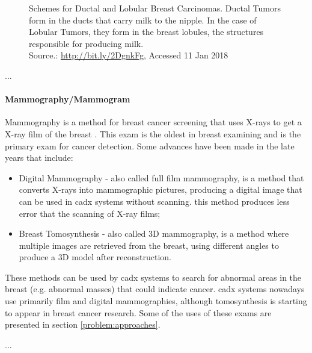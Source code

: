 \documentclass[
  twoside,
  11pt, a4paper,
  footinclude=true,
  headinclude=true,
  cleardoublepage=empty
]{scrbook}
\begin{document}
{\begin{figure}[t]
\begin{subfigure}[t]{0.5\textwidth}
                  \label{background:medical-image:breast-cancer-diagnosis:lobular}
                \end{subfigure}
                \caption[Schemes for Ductal and Lobular Breast Carcinomas]{Schemes for Ductal and Lobular Breast Carcinomas. Ductal Tumors form in the ducts that carry milk to the nipple. In the case of Lobular Tumors, they form in the breast lobules, the structures responsible for producing milk.\\Source.: \href{http://bit.ly/2DgnkFg}{http://bit.ly/2DgnkFg}, Accessed 11 Jan 2018}
                \label{background:medical-image:breast-cancer-diagnosis:types}
            \end{figure}
        }

        ...

        \paragraph{Mammography/Mammogram}
          Mammography is a method for breast cancer screening that uses X-rays to get a X-ray film of the breast \cite{starting2012mammography}. This exam is the oldest in breast examining and is the primary exam for cancer detection. Some advances have been made in the late years that include:

          \begin{itemize}
            \item Digital Mammography - also called full film mammography, is a method that converts X-rays into mammographic pictures, producing a digital image that can be used in \gls{cadx} systems without scanning. this method produces less error that the scanning of X-ray films;
            \item Breast Tomosynthesis - also called 3D mammography, is a method where multiple images are retrieved from the breast, using different angles to produce a 3D model after reconstruction.
          \end{itemize}

          These methods can be used by \gls{cadx} systems to search for abnormal areas in the breast (e.g. abnormal masses) that could indicate cancer. \gls{cadx} systems nowadays use primarily film and digital mammographies, although tomosynthesis is starting to appear in breast cancer research. Some of the uses of these exams are presented in section \ref{problem:approaches}.

        ...
\end{document}
